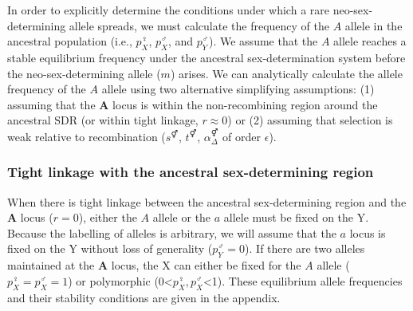 \documentclass[12pt]{article}
\begin{document}
In order to explicitly determine the conditions under which a rare neo-sex-determining allele spreads, we must calculate the frequency of the $A$ allele in the ancestral population (i.e., $p^\female_X$, $p^\male_X$, and $p^\male_Y$). 
We assume that the $A$ allele reaches a stable equilibrium frequency under the ancestral sex-determination system before the neo-sex-determining allele ($m$) arises. 
We can analytically calculate the allele frequency of the $A$ allele using two alternative simplifying assumptions: 
(1) assuming that the \textbf{A} locus is within the non-recombining region around the ancestral SDR (or within tight linkage, $r \approx 0$) or (2) assuming that selection is weak relative to recombination ($s^\Hermaphrodite$, $t^\Hermaphrodite$, $\alpha_{\Delta}^\Hermaphrodite$ of order $\epsilon$). 

\subsubsection*{Tight linkage with the ancestral sex-determining region}

When there is tight linkage between the ancestral sex-determining region and the \textbf{A} locus ($r=0$), either the $A$ allele or the $a$ allele must be fixed on the Y. 
Because the labelling of alleles is arbitrary, we will assume that the $a$ locus is fixed on the Y without loss of generality ($p^\male_Y=0$). 
If there are two alleles maintained at the \textbf{A} locus, the X can either be fixed for the $A$ allele ($p^\female_X=p^\male_X=1$) or polymorphic (0<$p^\female_X, p^\male_X$<1). 
These equilibrium allele frequencies and their stability conditions are given in the appendix.
\end{document}
